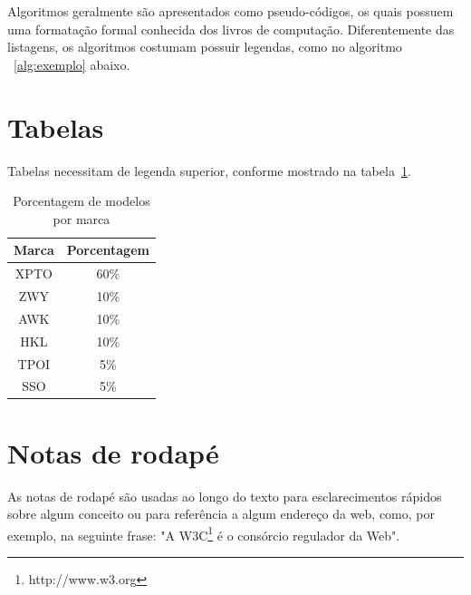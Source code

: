 \documentclass[a4paper,12pt]{monografia}
\theoremstyle{plain}
\theoremstyle{definition}
\theoremstyle{remark}
\begin{document}
 Algoritmos geralmente s\~ao apresentados como pseudo-c\'odigos, os quais possuem uma formata\c{c}\~ao formal conhecida dos livros de computa\c{c}\~ao. Diferentemente das listagens, os algoritmos costumam possuir legendas, como no algoritmo ~\ref{alg:exemplo} abaixo.

\begin{algorithm}
\label{alg:exemplo}
 \caption{Ler n\'umero e imprimir se \'e par ou n\~ao.}

\end{algorithm}


\section{Tabelas}

Tabelas necessitam de legenda superior, conforme mostrado na tabela~\ref{tab:modelos}.

\begin{table}[ht]
   \centering
   \caption{Porcentagem de modelos por marca}
   \label{tab:modelos}
   \begin{tabular}{| c | c |}
      \hline 
      Marca & Porcentagem \\
      \hline \hline 
      XPTO & 60\% \\
      \hline
      ZWY & 10\% \\
      \hline
      AWK & 10\% \\
      \hline
      HKL & 10\% \\
      \hline
      TPOI & 5\% \\
      \hline
      SSO & 5\% \\
      \hline
   \end{tabular} 
\end{table}

\section{Notas de rodap\'e}
As notas de rodap\'e s\~ao usadas ao longo do texto para esclarecimentos r\'apidos sobre algum conceito ou para refer\^encia a algum endere\c{c}o da web, como, por exemplo, na seguinte frase: "A W3C\footnote{http://www.w3.org} \'e o cons\'orcio regulador da Web".
\end{document}
